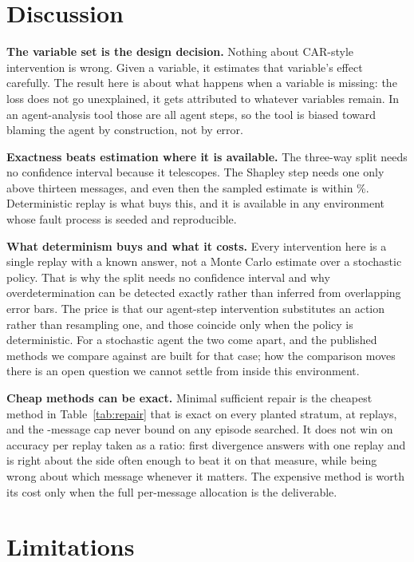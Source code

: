 \documentclass[conference]{IEEEtran}
\begin{document}
\section{Discussion}

\textbf{The variable set is the design decision.} Nothing about CAR-style
intervention is wrong. Given a variable, it estimates that variable's effect
carefully. The result here is about what happens when a variable is missing:
the loss does not go unexplained, it gets attributed to whatever variables
remain. In an agent-analysis tool those are all agent steps, so the tool is
biased toward blaming the agent by construction, not by error.

\textbf{Exactness beats estimation where it is available.} The three-way split
needs no confidence interval because it telescopes. The Shapley step needs one
only above thirteen messages, and even then the sampled estimate is within
\shapleyError\%. Deterministic replay is what buys this, and it is available in
any environment whose fault process is seeded and reproducible.

\textbf{What determinism buys and what it costs.} Every intervention here is
a single replay with a known answer, not a Monte Carlo estimate over a
stochastic policy. That is why the split needs no confidence interval and why
overdetermination can be detected exactly rather than inferred from overlapping
error bars. The price is that our agent-step intervention substitutes an action
rather than resampling one, and those coincide only when the policy is
deterministic. For a stochastic agent the two come apart, and the published
methods we compare against are built for that case; how the comparison moves
there is an open question we cannot settle from inside this environment.

\textbf{Cheap methods can be exact.} Minimal sufficient repair is the cheapest
method in Table~\ref{tab:repair} that is exact on every planted stratum, at
\minSuffReplays{} replays, and the \searchCap-message cap never bound on any
episode searched. It does not win on accuracy per replay taken as a ratio:
first divergence answers with one replay and is right about the side often
enough to beat it on that measure, while being wrong about which message
whenever it matters. The expensive method is worth its cost only when the
full per-message allocation is the deliverable.

\section{Limitations}
\label{sec:limits}
\end{document}
